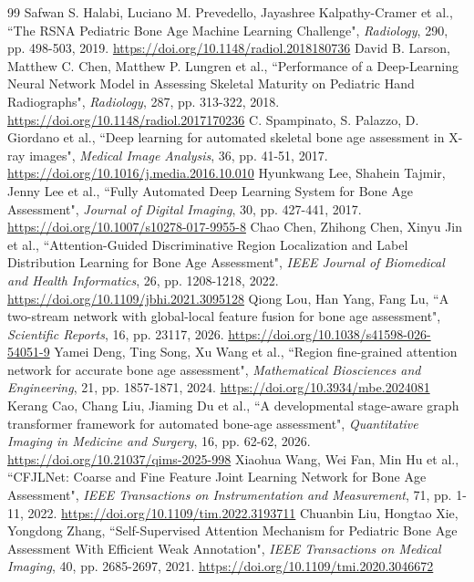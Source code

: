 \begin{thebibliography}{99}
 Safwan S. Halabi, Luciano M. Prevedello, Jayashree Kalpathy-Cramer et al., ``The RSNA Pediatric Bone Age Machine Learning Challenge", \emph{Radiology}, 290, pp. 498-503, 2019. \url{https://doi.org/10.1148/radiol.2018180736}
 David B. Larson, Matthew C. Chen, Matthew P. Lungren et al., ``Performance of a Deep-Learning Neural Network Model in Assessing Skeletal Maturity on Pediatric Hand Radiographs", \emph{Radiology}, 287, pp. 313-322, 2018. \url{https://doi.org/10.1148/radiol.2017170236}
 C. Spampinato, S. Palazzo, D. Giordano et al., ``Deep learning for automated skeletal bone age assessment in X-ray images", \emph{Medical Image Analysis}, 36, pp. 41-51, 2017. \url{https://doi.org/10.1016/j.media.2016.10.010}
 Hyunkwang Lee, Shahein Tajmir, Jenny Lee et al., ``Fully Automated Deep Learning System for Bone Age Assessment", \emph{Journal of Digital Imaging}, 30, pp. 427-441, 2017. \url{https://doi.org/10.1007/s10278-017-9955-8}
 Chao Chen, Zhihong Chen, Xinyu Jin et al., ``Attention-Guided Discriminative Region Localization and Label Distribution Learning for Bone Age Assessment", \emph{IEEE Journal of Biomedical and Health Informatics}, 26, pp. 1208-1218, 2022. \url{https://doi.org/10.1109/jbhi.2021.3095128}
 Qiong Lou, Han Yang, Fang Lu, ``A two-stream network with global-local feature fusion for bone age assessment", \emph{Scientific Reports}, 16, pp. 23117, 2026. \url{https://doi.org/10.1038/s41598-026-54051-9}
 Yamei Deng, Ting Song, Xu Wang et al., ``Region fine-grained attention network for accurate bone age assessment", \emph{Mathematical Biosciences and Engineering}, 21, pp. 1857-1871, 2024. \url{https://doi.org/10.3934/mbe.2024081}
 Kerang Cao, Chang Liu, Jiaming Du et al., ``A developmental stage-aware graph transformer framework for automated bone-age assessment", \emph{Quantitative Imaging in Medicine and Surgery}, 16, pp. 62-62, 2026. \url{https://doi.org/10.21037/qims-2025-998}
 Xiaohua Wang, Wei Fan, Min Hu et al., ``CFJLNet: Coarse and Fine Feature Joint Learning Network for Bone Age Assessment", \emph{IEEE Transactions on Instrumentation and Measurement}, 71, pp. 1-11, 2022. \url{https://doi.org/10.1109/tim.2022.3193711}
 Chuanbin Liu, Hongtao Xie, Yongdong Zhang, ``Self-Supervised Attention Mechanism for Pediatric Bone Age Assessment With Efficient Weak Annotation", \emph{IEEE Transactions on Medical Imaging}, 40, pp. 2685-2697, 2021. \url{https://doi.org/10.1109/tmi.2020.3046672}

\end{thebibliography}
